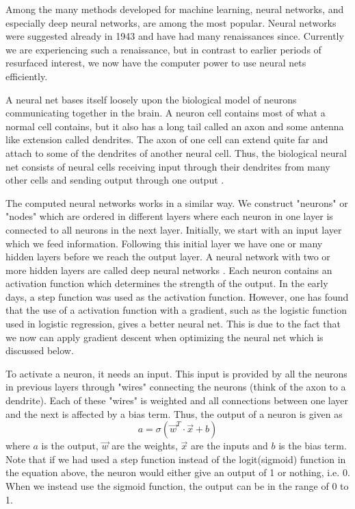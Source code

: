 Among the many methods developed for machine learning, neural networks, and especially deep neural networks, are among the most popular. Neural networks were suggested already in 1943 \cite{McCulloch1943} and have had many renaissances since. Currently we are experiencing such a renaissance, but in contrast to earlier periods of resurfaced interest, we now have the computer power to use neural nets efficiently.

A neural net bases itself loosely upon the biological model of neurons communicating together in the brain. A neuron cell contains most of what a normal cell contains, but it also has a long tail called an axon and some antenna like extension called dendrites. The axon of one cell can extend quite far and attach to some of the dendrites of another neural cell. Thus, the biological neural net consists of neural cells receiving input through their dendrites from many other cells and sending output through one output \citep[p. 257]{Geron}.

The computed neural networks works in a similar way. We construct "neurons" or "nodes" which are ordered in different layers where each neuron in one layer is connected to all neurons in the next layer. Initially, we start with an input layer which we feed information. Following this initial layer we have one or many hidden layers before we reach the output layer. A neural network with two or more hidden layers are called deep neural networks \citep[p. 263]{Geron}. Each neuron contains an activation function which determines the strength of the output. In the early days, a step function was used as the activation function. However, one has found that the use of a activation function with a gradient, such as the logistic function used in logistic regression, gives a better neural net. This is due to the fact that we now can apply gradient descent when optimizing the neural net which is discussed below.

To activate a neuron, it needs an input. This input is provided by all the neurons in previous layers through "wires" connecting the neurons (think of the axon to a dendrite). Each of these "wires" is weighted and all connections between one layer and the next is affected by a bias term. Thus, the output of a neuron is given as \citep[p. 260]{Geron}
\begin{equation}
a = \sigma(\vec{w}^T \cdot \vec{x} + b)
\label{eqT:activation}
\end{equation}
where $a$ is the output, $\vec{w}$ are the weights, $\vec{x}$ are the inputs and $b$ is the bias term. Note that if we had used a step function instead of the logit(sigmoid) function in the equation above, the neuron would either give an output of 1 or nothing, i.e. 0. When we instead use the sigmoid function, the output can be in the range of 0 to 1.

